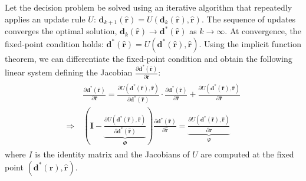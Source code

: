 \documentclass[ijoc,sglanonrev]{informs4}
\begin{document}

Let the decision problem be solved using an iterative algorithm that repeatedly applies an update rule $U$: $\mathbf{d}_{k+1}(\hat{\mathbf{r}}) = U(\mathbf{d}_k(\hat{\mathbf{r}}), \hat{\mathbf{r}})$. The sequence of updates converges the optimal solution, $\mathbf{d}_{k}(\hat{\mathbf{r}}) \rightarrow \mathbf{d}^*(\hat{\mathbf{r}})$ as $k \rightarrow \infty$. 
At convergence, the fixed-point condition holds: $\mathbf{d}^*(\hat{\mathbf{r}}) = U(\mathbf{d}^*(\hat{\mathbf{r}}), \hat{\mathbf{r}})$. Using the implicit function theorem, we can differentiate the fixed-point condition and obtain the following linear system defining the Jacobian $\frac{\partial \mathbf{d}^*(\hat{\mathbf{r}})}{\partial \hat{\mathbf{r}}}$:
\begin{gather*}
\begin{aligned}
    & \frac{\partial \mathbf{d}^*(\hat{\mathbf{r}})}{\partial \hat{\mathbf{r}}} = \frac{\partial U(\mathbf{d}^*(\hat{\mathbf{r}}), \hat{\mathbf{r}})}{\partial \mathbf{d}^*(\hat{\mathbf{r}})} \cdot \frac{\partial \mathbf{d}^*(\hat{\mathbf{r}})}{\partial \hat{\mathbf{r}}} + \frac{\partial U(\mathbf{d}^*(\hat{\mathbf{r}}), \hat{\mathbf{r}})}{\partial \hat{\mathbf{r}}} \\
\Rightarrow ~ & \left (\mathbf{I} - \underbrace{\frac{\partial U(\mathbf{d}^*(\hat{\mathbf{r}}), \hat{\mathbf{r}})}{\partial \mathbf{d}^*(\hat{\mathbf{r}})}}_{\Phi} \right) \frac{\partial \mathbf{d}^*(\hat{\mathbf{r}})}{\partial \hat{\mathbf{r}}}  = \underbrace{\frac{\partial U(\mathbf{d}^*(\hat{\mathbf{r}}), \hat{\mathbf{r}})}{\partial \hat{\mathbf{r}}}}_{\Psi}
\end{aligned} 
\end{gather*}
where $I$ is the identity matrix and the Jacobians of $U$ are computed at the fixed point $(\mathbf{d}^*(\hat{\mathbf{r}}), \hat{\mathbf{r}})$.
\end{document}
